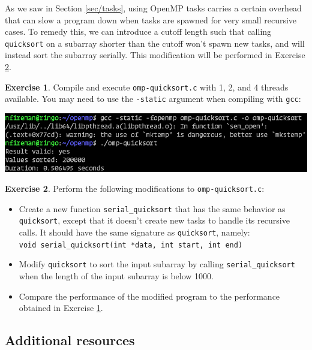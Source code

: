 \documentclass{article}
\theoremstyle{definition}
\newtheorem{exercise}{Exercise}
\begin{document}
As we saw in Section \ref{sec/tasks}, using OpenMP tasks carries a certain overhead that can slow a program down when tasks are spawned for very small recursive cases. To remedy this, we can introduce a cutoff length such that calling \texttt{quicksort} on a subarray shorter than the cutoff won't spawn new tasks, and will instead sort the subarray serially. This modification will be performed in Exercise \ref{ex/quicksort-cutoff}.

\begin{exercise}
\label{ex/quicksort-1}
Compile and execute \texttt{omp-quicksort.c} with 1, 2, and 4 threads available. You may need to use the \texttt{-static} argument when compiling with \texttt{gcc}:

\includegraphics[width=\textwidth]{images/quicksort-output.png}
\end{exercise}

\begin{exercise}
\label{ex/quicksort-cutoff}
Perform the following modifications to \texttt{omp-quicksort.c}:
\begin{itemize}
    \item Create a new function \texttt{serial\_quicksort} that has the same behavior as \texttt{quicksort}, except that it doesn't create new tasks to handle its recursive calls. It should have the same signature as \texttt{quicksort}, namely:\\
    \texttt{void serial\_quicksort(int *data, int start, int end)}
    
    \item Modify \texttt{quicksort} to sort the input subarray by calling \texttt{serial\_quicksort} when the length of the input subarray is below 1000.
    
    \item Compare the performance of the modified program to the performance obtained in Exercise \ref{ex/quicksort-1}.
\end{itemize}
\end{exercise}

\subsection*{Additional resources}
\end{document}
